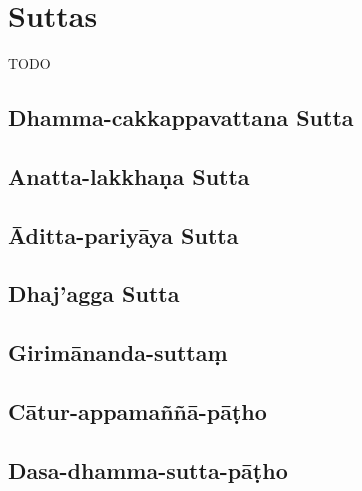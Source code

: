 \chapter{Suttas}

TODO

\section{Dhamma-cakkappavattana Sutta}

\section{Anatta-lakkhaṇa Sutta}

\section{Āditta-pariyāya Sutta}

\section{Dhaj'agga Sutta}

\section{Girimānanda-suttaṃ}

\section{Cātur-appamaññā-pāṭho}

\section{Dasa-dhamma-sutta-pāṭho}

